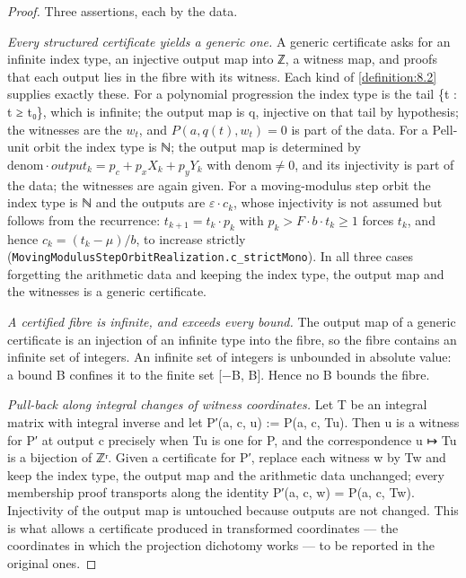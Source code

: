 \begin{proof}
Three assertions, each by the data.

\emph{Every structured certificate yields a generic one.} A generic certificate asks for an infinite index type, an injective output map into ℤ, a witness map, and proofs that each output lies in the fibre with its witness. Each kind of \cref{definition:8.2} supplies exactly these. For a polynomial progression the index type is the tail \{t : t ≥ t₀\}, which is infinite; the output map is q, injective on that tail by hypothesis; the witnesses are the $w_{t}$, and $P(a, q(t), w_{t}) = 0$ is part of the data. For a Pell-unit orbit the index type is ℕ; the output map is determined by $\mathrm{denom}·output_{k} = p_{c} + p_{x} X_{k} + p_{y} Y_{k}$ with $\mathrm{denom} ≠ 0$, and its injectivity is part of the data; the witnesses are again given. For a moving-modulus step orbit the index type is ℕ and the outputs are $ε·c_{k}$, whose injectivity is not assumed but follows from the recurrence: $t_{k+1} = t_{k}·p_{k}$ with $p_{k} > F·b·t_{k} ≥ 1$ forces $t_{k}$, and hence $c_{k} = (t_{k} − μ)/b$, to increase strictly (\texttt{MovingModulusStepOrbitRealization.\allowbreak{}c\_\allowbreak{}strictMono}). In all three cases forgetting the arithmetic data and keeping the index type, the output map and the witnesses is a generic certificate.

\emph{A certified fibre is infinite, and exceeds every bound.} The output map of a generic certificate is an injection of an infinite type into the fibre, so the fibre contains an infinite set of integers. An infinite set of integers is unbounded in absolute value: a bound B confines it to the finite set [−B, B]. Hence no B bounds the fibre.

\emph{Pull-back along integral changes of witness coordinates.} Let T be an integral matrix with integral inverse and let P′(a, c, u) := P(a, c, Tu). Then u is a witness for P′ at output c precisely when Tu is one for P, and the correspondence u ↦ Tu is a bijection of ℤʳ. Given a certificate for P′, replace each witness w by Tw and keep the index type, the output map and the arithmetic data unchanged; every membership proof transports along the identity P′(a, c, w) = P(a, c, Tw). Injectivity of the output map is untouched because outputs are not changed. This is what allows a certificate produced in transformed coordinates — the coordinates in which the projection dichotomy works — to be reported in the original ones.


\end{proof}
